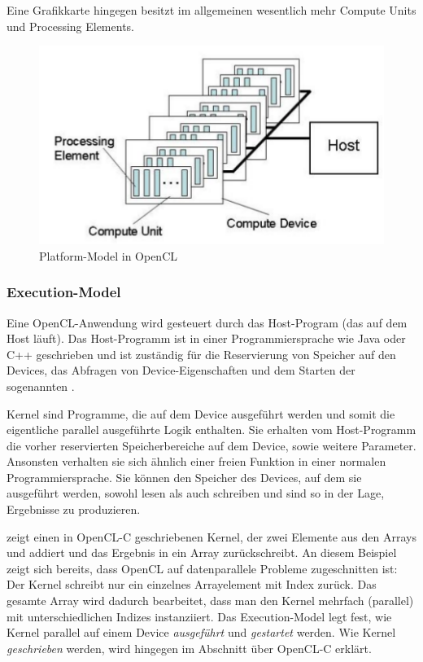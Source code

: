 Eine Grafikkarte hingegen besitzt im allgemeinen wesentlich mehr
Compute Units und Processing Elements.

\begin{figure}[ht]
\centering
\includegraphics[width=14cm]{images/opencl_platform_model}
\caption{Platform-Model in OpenCL}
\label{fig:opencl_platform_model}
\end{figure}

\subsubsection{Execution-Model}
\label{sec:opencl_execution_model}

Eine OpenCL-Anwendung wird gesteuert durch das Host-Program (das auf
dem Host läuft). Das Host-Programm ist in einer Programmiersprache wie
Java oder C++ geschrieben und ist zuständig für die Reservierung von
Speicher auf den Devices, das Abfragen von Device-Eigenschaften und
dem Starten der sogenannten .

Kernel sind Programme, die auf dem Device ausgeführt werden und somit
die eigentliche parallel ausgeführte Logik enthalten. Sie erhalten vom
Host-Programm die vorher reservierten Speicherbereiche auf dem Device,
sowie weitere Parameter. Ansonsten verhalten sie sich ähnlich einer
freien Funktion in einer normalen Programmiersprache. Sie können den
Speicher des Devices, auf dem sie ausgeführt werden, sowohl lesen als
auch schreiben und sind so in der Lage, Ergebnisse zu produzieren.

 zeigt einen in
OpenCL-C geschriebenen Kernel, der zwei Elemente aus den Arrays
 und  addiert und das
Ergebnis in ein Array  zurückschreibt. An
diesem Beispiel zeigt sich bereits, dass OpenCL auf datenparallele
Probleme zugeschnitten ist: Der Kernel schreibt nur ein einzelnes
Arrayelement mit Index  zurück. Das gesamte Array
wird dadurch bearbeitet, dass man den Kernel mehrfach (parallel) mit
unterschiedlichen Indizes instanziiert. Das Execution-Model legt fest,
wie Kernel parallel auf einem Device \emph{ausgeführt} und
\emph{gestartet} werden. Wie Kernel \emph{geschrieben} werden, wird
hingegen im Abschnitt über OpenCL-C erklärt.

